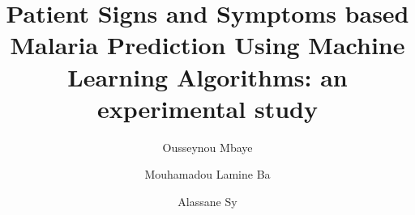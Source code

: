 \documentclass[runningheads]{llncs}
\begin{document}
\title{Patient Signs and Symptoms based Malaria Prediction Using Machine Learning Algorithms: an experimental study}

\author{Ousseynou Mbaye \and Mouhamadou Lamine Ba  \and Alassane Sy}
%
%







\end{document}
